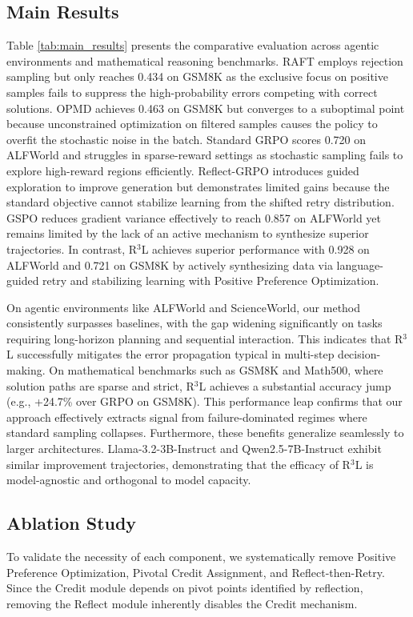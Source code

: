 \documentclass[11pt]{article}
\begin{document}
\subsection{Main Results}

Table \ref{tab:main_results} presents the comparative evaluation across agentic environments and mathematical reasoning benchmarks. RAFT employs rejection sampling but only reaches 0.434 on GSM8K as the exclusive focus on positive samples fails to suppress the high-probability errors competing with correct solutions. OPMD achieves 0.463 on GSM8K but converges to a suboptimal point because unconstrained optimization on filtered samples causes the policy to overfit the stochastic noise in the batch. Standard GRPO scores 0.720 on ALFWorld and struggles in sparse-reward settings as stochastic sampling fails to explore high-reward regions efficiently. Reflect-GRPO introduces guided exploration to improve generation but demonstrates limited gains because the standard objective cannot stabilize learning from the shifted retry distribution. GSPO reduces gradient variance effectively to reach 0.857 on ALFWorld yet remains limited by the lack of an active mechanism to synthesize superior trajectories. In contrast, R$^3$L achieves superior performance with 0.928 on ALFWorld and 0.721 on GSM8K by actively synthesizing data via language-guided retry and stabilizing learning with Positive Preference Optimization.

On agentic environments like ALFWorld and ScienceWorld, our method consistently surpasses baselines, with the gap widening significantly on tasks requiring long-horizon planning and sequential interaction. This indicates that R$^3$L successfully mitigates the error propagation typical in multi-step decision-making. On mathematical benchmarks such as GSM8K and Math500, where solution paths are sparse and strict, R$^3$L achieves a substantial accuracy jump (e.g., +24.7\% over GRPO on GSM8K). This performance leap confirms that our approach effectively extracts signal from failure-dominated regimes where standard sampling collapses. Furthermore, these benefits generalize seamlessly to larger architectures. Llama-3.2-3B-Instruct and Qwen2.5-7B-Instruct exhibit similar improvement trajectories, demonstrating that the efficacy of R$^3$L is model-agnostic and orthogonal to model capacity.


\subsection{Ablation Study}
To validate the necessity of each component, we systematically remove Positive Preference Optimization, Pivotal Credit Assignment, and Reflect-then-Retry. Since the Credit module depends on pivot points identified by reflection, removing the Reflect module inherently disables the Credit mechanism.
\end{document}
